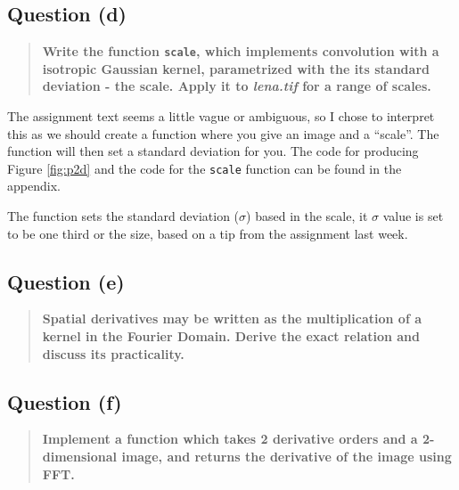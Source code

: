 \subsection{Question (d)}
\begin{quote}
  \textbf{Write the function \texttt{scale}, which implements convolution with a
    isotropic Gaussian kernel, parametrized with the its standard deviation - the scale. Apply it to
    \textit{lena.tif} for a range of scales.}
\end{quote}

The assignment text seems a little vague or ambiguous, so I chose to interpret this as we should
create a function where you give an image and a ``scale''. The function will then set a standard
deviation for you. The code for producing Figure \ref{fig:p2d} and the code for the \texttt{scale}
function can be found in the appendix.


The function sets the standard deviation ($\sigma$) based in the scale, it $\sigma$ value is set to
be one third or the size, based on a tip from the assignment last week.

\subsection{Question (e)}
\begin{quote}
  \textbf{Spatial derivatives may be written as the multiplication of a kernel
    in the Fourier Domain.  Derive the exact relation and discuss its
    practicality.}
\end{quote}

\subsection{Question (f)}
\begin{quote}
  \textbf{Implement a function which takes 2 derivative orders and a
    2-dimensional image, and returns the derivative of the image using FFT.}
\end{quote}
